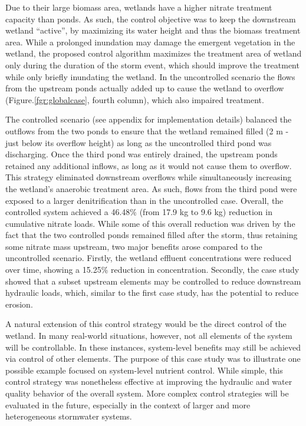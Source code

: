 Due to their large biomass area, wetlands have a higher nitrate treatment capacity than ponds\cite{Scholes2008APotentials}. 
As such, the control objective was to keep the downstream wetland ``active'', by
maximizing its water height and thus the biomass treatment area. While a prolonged  inundation may damage the emergent vegetation in the wetland, the proposed control algorithm maximizes the treatment area of wetland only during the duration of the storm event, which should improve the treatment while only briefly inundating the wetland.
In the uncontrolled scenario the flows from the upstream ponds actually added up to cause the wetland to overflow (Figure.\ref{fgr:globalcase}, fourth column), which also impaired treatment. 

The controlled scenario (see appendix for implementation details) balanced the outflows from the two ponds to ensure that the wetland remained filled (2 m - just below its overflow height) as long as the uncontrolled third pond was discharging. Once the third pond was entirely drained, the upstream ponds retained any additional inflows, as long as it would not cause them to overflow. This strategy eliminated downstream overflows while simultaneously increasing the wetland's anaerobic treatment area. As such, flows from the third pond were exposed to a larger denitrification than in the uncontrolled case. Overall, the controlled system achieved a 46.48\% (from 17.9 kg to 9.6 kg) reduction in cumulative nitrate loads.  While some of this overall reduction was driven by the fact that the two controlled ponds remained filled after the storm, thus retaining some nitrate mass upstream, two major benefits arose compared to the uncontrolled scenario. Firstly, the wetland effluent concentrations were reduced over time, showing a 15.25\% reduction in concentration. Secondly, the case study showed that a subset upstream elements may be controlled to reduce downstream hydraulic loads, which, similar to the first case study, has the potential to reduce erosion. 

A natural extension of this control strategy would be the direct control of the wetland. In many real-world situations, however, not all elements of the system will be controllable. In these instances, system-level benefits may still be achieved via control of other elements. The purpose of this case study was to illustrate one possible example focused on system-level nutrient control. While simple, this control strategy was nonetheless effective at improving the hydraulic and water quality behavior of the overall system. More complex control strategies will be evaluated in the future, especially in the context of larger and more heterogeneous stormwater systems. 


